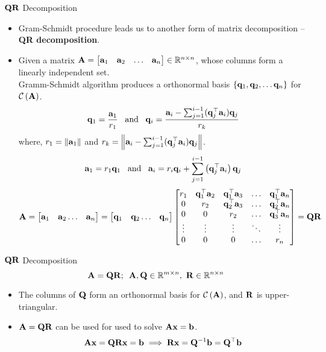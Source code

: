 \documentclass[aspectratio=169]{beamer}
\let\olditem\item
\renewcommand{\item}{\setlength{\itemsep}{\fill}\olditem}
\def\mf{\ensuremath\mathbf}
\def\mb{\ensuremath\mathbb}
\def\mc{\ensuremath\mathcal}
\def\lp{\ensuremath\left(}
\def\rp{\ensuremath\right)}
\begin{document}
\begin{frame}[t]{$\mf{QR}$ Decomposition}
\vspace{-0.25cm}
\begin{footnotesize}
\begin{itemize}
    \item Gram-Schmidt procedure leads us to another form of matrix  decomposition -- \textbf{QR decomposition}.
    \item Given a matrix $\mf{A} = \begin{bmatrix*}\mf{a}_1&\mf{a}_2&\ldots&\mf{a}_n\end{bmatrix*} \in \mb{R}^{n \times n}$, whose columns form a linearly independent set.\\
    Gramm-Schmidt algorithm produces a orthonormal basis $\left\{\mf{q}_1, \mf{q}_2, \ldots \mf{q}_n\right\}$ for $\mc{C}\lp \mf{A}\rp $.
    \[ \mf{q}_1 = \frac{\mf{a}_1}{r_1}\,\,\,\text{ and }\,\,\, \mf{q}_i = \frac{\mf{a}_i - \sum_{j=1}^{i-1}(\mf{q}_j^\top\mf{a}_i)\mf{q}_j}{r_k} \]
    where, $r_1 = \left\lVert \mf{a}_1\right\rVert$ and $r_k = \left\lVert \mf{a}_i - \sum_{j=1}^{i-1}(\mf{q}_j^\top\mf{a}_i)\mf{q}_j\right\rVert$.
    \[ \mf{a}_1 = r_1\mf{q}_1\,\,\,\text{ and }\,\,\,\mf{a}_i = r_i\mf{q}_i + \sum_{j=1}^{i-1}\lp \mf{q}_j^\top\mf{a}_i\rp \mf{q}_j\]
    \[ \mf{A} = \begin{bmatrix*}\mf{a}_1 & \mf{a}_2 \ldots & \mf{a}_n\end{bmatrix*} =  \begin{bmatrix*}\mf{q}_1 & \mf{q}_2 \ldots & \mf{q}_n\end{bmatrix*}
    \begin{bmatrix*}
    r_1 & \mf{q}_1^\top\mf{a}_2 & \mf{q}_1^\top\mf{a}_3 & \ldots & \mf{q}_1^\top\mf{a}_n\\
    0 & r_2 & \mf{q}_2^\top\mf{a}_3 & \ldots & \mf{q}_2^\top\mf{a}_n\\
    0 & 0 & r_2 & \ldots & \mf{q}_3^\top\mf{a}_n\\
    \vdots & \vdots & \vdots & \ddots & \vdots\\
    0 & 0 & 0 & \ldots & r_n\\\end{bmatrix*} = \mf{QR} \]
\end{itemize}
\end{footnotesize}
\end{frame}


\begin{frame}[t]{$\mf{QR}$ Decomposition}
$$\mf{A} = \mf{QR}; \,\,\, \mf{A}, \mf{Q} \in \mb{R}^{m \times n},\,\, \mf{R} \in \mb{R}^{n \times n}$$
\begin{itemize}
    \item The columns of $\mf{Q}$ form an orthonormal basis for $\mc{C}\lp \mf{A}\rp$, and $\mf{R}$ is upper-triangular.
    \item $\mf{A} = \mf{QR}$ can be used for used to solve $\mf{Ax} = \mf{b}$.
    \[ \mf{Ax} = \mf{QRx} = \mf{b} \implies \mf{Rx} = \mf{Q}^{-1}\mf{b} = \mf{Q}^\top\mf{b} \]
\end{itemize}
\end{frame}
\end{document}
